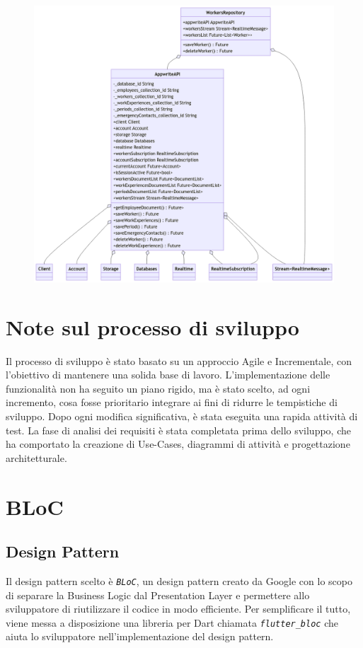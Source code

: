 \documentclass[a4paper, oneside, 12pt]{article}
\begin{document}
\begin{figure}[H]
	\centering
	\includegraphics[width = 10 cm]{images/uml_2.png}
	\label{fig:attività dipendenti}
\end{figure}



\newpage
\section{Note sul processo di sviluppo}
Il processo di sviluppo è stato basato su un approccio Agile e Incrementale, con l'obiettivo di mantenere una solida base di lavoro. 
L'implementazione delle funzionalità non ha seguito un piano rigido, ma è stato scelto, ad ogni incremento, cosa fosse prioritario integrare
ai fini di ridurre le tempistiche di sviluppo. Dopo ogni modifica significativa, è stata eseguita una rapida attività di test. La fase di analisi 
dei requisiti è stata completata prima dello sviluppo, che ha comportato la creazione di Use-Cases, diagrammi di attività e progettazione architetturale.


\newpage
\section{BLoC}
\subsection{Design Pattern}
Il design pattern scelto è \textit{\texttt{BLoC}}, un design pattern creato da Google con lo scopo di separare la Business Logic dal Presentation Layer 
e permettere allo sviluppatore di riutilizzare il codice in modo efficiente. Per semplificare il tutto, viene messa a disposizione una libreria 
per Dart chiamata \textit{\texttt{flutter\_bloc}} che aiuta lo sviluppatore nell'implementazione del design pattern.
\end{document}
